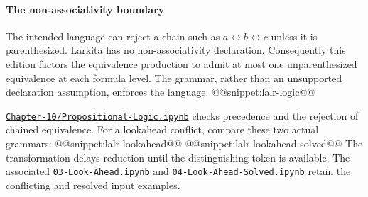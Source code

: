 \paragraph{The non-associativity boundary} The intended language can reject a chain such as $a\leftrightarrow b\leftrightarrow c$ unless it is parenthesized.
Larkita has no non-associativity declaration.
Consequently this edition factors the equivalence production to admit at most one unparenthesized equivalence at each formula level.
The grammar, rather than an unsupported declaration assumption, enforces the language.
@@snippet:lalr-logic@@

\href{../../Chapter-10/Propositional-Logic.ipynb}{\nolinkurl{Chapter-10/Propositional-Logic.ipynb}} checks precedence and the rejection of chained equivalence.
For a lookahead conflict, compare these two actual grammars:
@@snippet:lalr-lookahead@@
@@snippet:lalr-lookahead-solved@@
The transformation delays reduction until the distinguishing token is available.
The associated \href{../../Chapter-10/03-Look-Ahead.ipynb}{\nolinkurl{03-Look-Ahead.ipynb}} and \href{../../Chapter-10/04-Look-Ahead-Solved.ipynb}{\nolinkurl{04-Look-Ahead-Solved.ipynb}} retain the conflicting and resolved input examples.
